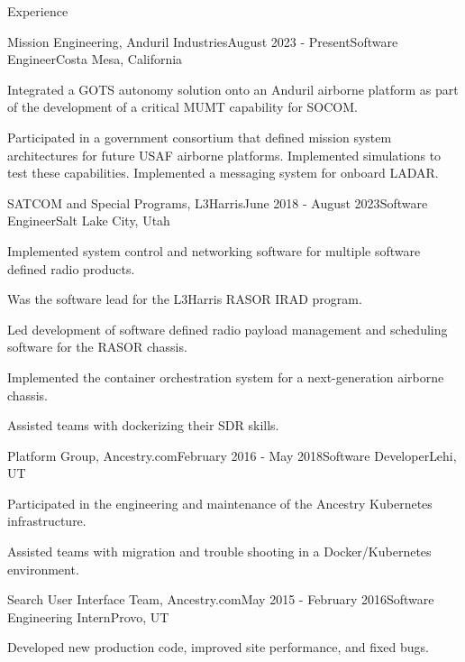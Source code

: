 \documentclass{resume} %
\begin{document}
\begin{rSection}{Experience}

  \begin{rSubsection}{Mission Engineering, Anduril Industries}{August 2023 - Present}{Software Engineer}{Costa Mesa, California}
  \item Integrated a GOTS autonomy solution onto an Anduril airborne platform as part of the development of a critical MUMT capability for SOCOM.
  \item Participated in a government consortium that defined mission system architectures for future USAF airborne platforms. Implemented simulations to test these capabilities. Implemented a messaging system for onboard LADAR. 
  \end{rSubsection}

  \begin{rSubsection}{SATCOM and Special Programs, L3Harris}{June 2018 - August 2023}{Software Engineer}{Salt Lake City, Utah}
  \item Implemented system control and networking software for multiple software defined radio products. 
  \item Was the software lead for the L3Harris RASOR IRAD program. 
  \item Led development of software defined radio payload management and scheduling software for the RASOR chassis. 
  \item Implemented the container orchestration system for a next-generation airborne chassis.
  \item Assisted teams with dockerizing their SDR skills.
  \end{rSubsection}
  
  \begin{rSubsection}{Platform Group, Ancestry.com}{February 2016 - May 2018}{Software Developer}{Lehi, UT}
  \item Participated in the engineering and maintenance of the Ancestry Kubernetes infrastructure.
  \item Assisted teams with migration and trouble shooting in a Docker/Kubernetes environment.
  \end{rSubsection}
  
  \begin{rSubsection}{Search User Interface Team, Ancestry.com}{May 2015 - February 2016}{Software Engineering Intern}{Provo, UT}
  \item Developed new production code, improved site performance, and fixed bugs.
  \end{rSubsection}


\end{rSection}
\end{document}
